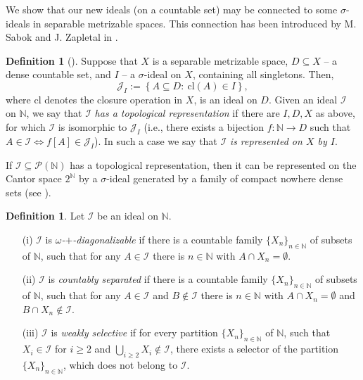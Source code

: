 \documentclass{amsart}
\theoremstyle{definition}
\newtheorem{df}[thm]{Definition}
\newcommand{\N}{{\mathbb N}}
\newcommand{\I}{\mathcal I}
\newcommand{\cl}{\mathrm{cl}}
\begin{document}
We show that our new ideals (on a countable set) may be connected to some $\sigma$-ideals in separable metrizable spaces. This connection has been introduced by M. Sabok and J. Zapletal in \cite{Sabok}. 

\begin{df}[\cite{Sabok}]
Suppose that $X$ is a separable metrizable space, $D\subseteq X$ -- a dense countable set, and $I$ -- a $\sigma$-ideal on $X$, containing all singletons. Then,
$$\mathcal{J}_I:=\left\{A\subseteq D :\ \cl(A)\in I\right\},$$
where $\cl$ denotes the closure operation in $X$,
is an ideal on $D$. Given an ideal $\mathcal{I}$ on $\N$, we say that $\mathcal{I}$ \emph{has a topological representation} if there are $I,D,X$ as above, for which $\mathcal{I}$ is isomorphic to $\mathcal{J}_I$ (i.e., there exists a bijection $f\colon \N\to D$ such that $A\in\I \Leftrightarrow f[A]\in\mathcal{J}_I$). In such a case we say that $\mathcal{I}$ \emph{is represented on $X$ by $I$}.
\end{df}

If $\mathcal{I}\subseteq\mathcal{P}(\N)$ has a topological representation, then it can be represented on the Cantor space $2^\N$ by a $\sigma$-ideal generated by a family of compact nowhere dense sets (see \cite[Corollary 1.3]{Adas}). 

\begin{df} Let $\mathcal{I}$ be an ideal on $\N$.
\begin{enumerate}
\item[(i)] $\mathcal{I}$ is \emph{$\omega$-$+$-diagonalizable} if there is a countable family $\{X_n\}_{n\in\N}$ of subsets of $\N$, such that for any $A\in \mathcal{I}$ there is $n\in\N$ with $A\cap X_n=\emptyset$.
\item[(ii)] $\mathcal{I}$ is \emph{countably separated} if there is a countable family $\{X_n\}_{n\in\N}$ of subsets of $\N$, such that for any $A\in \mathcal{I}$ and $B\notin \mathcal{I}$ there is $n\in\N$ with $A\cap X_n=\emptyset$ and $B\cap X_n\notin \mathcal{I}$. %
\item[(iii)] $\mathcal{I}$ is \emph{weakly selective} if for every partition $\{X_n\}_{n\in\N}$ of $\N$, such that $X_i\in\I$ for $i\geq 2$ and $\bigcup_{i\geq 2}{X_i} \notin\I$, there exists a selector of the partition $\{X_n\}_{n\in\N}$, which does not belong to $\I$.
\end{enumerate}
\end{df}
\end{document}
